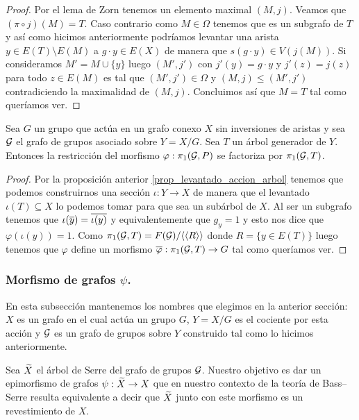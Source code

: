 \documentclass[tesis.tex]{subfiles}
\begin{document}
\begin{proof}
	
	Por el lema de Zorn tenemos un elemento maximal $(M,j)$.
	Veamos que $(\pi \circ j)(M) = T$.
	Caso contrario como $M \in \Omega$ tenemos que es un subgrafo de $T$ y así como hicimos anteriormente podríamos levantar una arista $y \in E(T) \setminus E(M)$ a $g\cdot y \in E(X)$ de manera que $s(g\cdot y ) \in V(j(M))$.
	Si consideramos $M' =M \cup \{y\}$ luego $(M', j')$ con $j'(y) = g \cdot y$ y $j'(z) = j(z)$ para todo $z \in E(M)$ es tal que $(M',j') \in \Omega$ y $(M,j) \le (M',j')$ contradiciendo la maximalidad de $(M,j)$.
	Concluimos así que $M = T$ tal como queríamos ver.	
\end{proof}


\begin{coro}
	Sea $G$ un grupo que actúa en un grafo conexo $X$ sin inversiones de aristas y sea ${\cal G}$ el grafo de grupos asociado sobre $Y = X / G$.
	Sea $T$ un árbol generador de $Y$.
	Entonces la restricción del morfismo $\varphi: \pi_1({\cal G}, P)$ se factoriza por $\pi_1({\cal G}, T)$.
\end{coro}
\begin{proof}
	Por la proposición anterior \ref{prop_levantado_accion_arbol} tenemos que
	podemos construirnos una sección $\iota:Y \to X$ de manera que el levantado $\iota(T) \subseteq X$ lo podemos tomar para que sea un subárbol de $X$.
	Al ser un subgrafo tenemos que $\iota(\overline y) = \overline {\iota (y)}$ y equivalentemente que $g_{y}=1$ y esto nos dice que $\varphi(\iota(y)) = 1$.
	Como $\pi_1({\cal G},T) = F({\cal G}) / \langle \langle R \rangle \rangle$ donde $R = \{ y \in E(T) \}$ luego tenemos que $\varphi$ define un morfismo $\overline \varphi: \pi_1({\cal G}, T) \to G$ tal como queríamos ver.
\end{proof}

\subsubsection{Morfismo de grafos $\psi$.}

En esta subsección mantenemos los nombres que elegimos en la anterior sección: $X$ es un grafo en el cual actúa un grupo $G$, $Y = X/G$ es el cociente por esta acción y ${\cal G}$ es un grafo de grupos sobre $Y$ construido tal como lo hicimos anteriormente.

Sea $\widetilde X$ el árbol de Serre del grafo de grupos ${\cal G}$.
Nuestro objetivo es dar un epimorfismo de grafos $\psi:\widetilde X \to X$ que en nuestro contexto de la teoría de Bass--Serre resulta equivalente a decir que $\widetilde X$ junto con este morfismo es un revestimiento de $X$.
\end{document}
